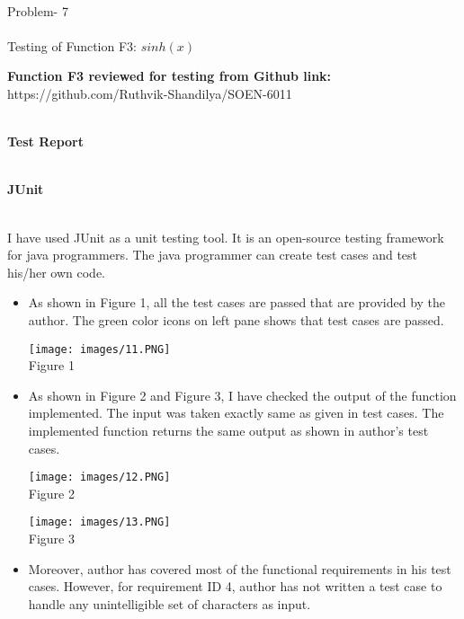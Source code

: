 \documentclass[10pt,letterpaper]{article}
\begin{document}
\begin{large}
\begin{center}
\\\Large Problem- 7\\
\\\Large Testing of Function F3: $sinh(x)$
\end{center}
\end{large}
\textbf{Function F3 reviewed for testing from Github link:} https://github.com/Ruthvik-Shandilya/SOEN-6011 
\begin{large}
\begin{center}
\\\Large \textbf{Test Report}\\
\end{center}
\end{large}
\begin{large}
\\\Large \textbf{JUnit}\\\\
\end{large}
I have used JUnit as a unit testing tool. It is an open-source testing framework for java programmers. The java programmer can create test cases and test his/her own code.
\begin{itemize}
    \item As shown in Figure 1, all the test cases are passed that are provided by the author. The green color icons on left pane shows that test cases are passed.
\begin{center}
    \texttt{[image: images/11.PNG]}\\
  \caption{Figure 1}
\end{center}
\newpage
    \item As shown in Figure 2 and Figure 3, I have checked the output of the function implemented. The input was taken exactly same as given in test cases. The implemented function returns the same output as shown in author's test cases.
    \begin{center}
    \texttt{[image: images/12.PNG]}\\
  \caption{Figure 2}
\end{center}
\begin{center}
    \texttt{[image: images/13.PNG]}\\
  \caption{Figure 3}
\end{center}
\item Moreover, author has covered most of the functional requirements in his test cases. However, for requirement ID 4, author has not written a test case to handle any unintelligible set of characters as input. 
\end{itemize}
\end{document}
